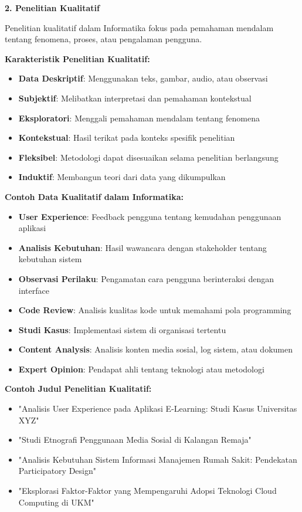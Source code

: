 \textbf{2. Penelitian Kualitatif}

Penelitian kualitatif dalam Informatika fokus pada pemahaman mendalam tentang fenomena, proses, atau pengalaman pengguna.

\textbf{Karakteristik Penelitian Kualitatif:}
\begin{itemize}
    \item \textbf{Data Deskriptif}: Menggunakan teks, gambar, audio, atau observasi
    \item \textbf{Subjektif}: Melibatkan interpretasi dan pemahaman kontekstual
    \item \textbf{Eksploratori}: Menggali pemahaman mendalam tentang fenomena
    \item \textbf{Kontekstual}: Hasil terikat pada konteks spesifik penelitian
    \item \textbf{Fleksibel}: Metodologi dapat disesuaikan selama penelitian berlangsung
    \item \textbf{Induktif}: Membangun teori dari data yang dikumpulkan
\end{itemize}

\textbf{Contoh Data Kualitatif dalam Informatika:}
\begin{itemize}
    \item \textbf{User Experience}: Feedback pengguna tentang kemudahan penggunaan aplikasi
    \item \textbf{Analisis Kebutuhan}: Hasil wawancara dengan stakeholder tentang kebutuhan sistem
    \item \textbf{Observasi Perilaku}: Pengamatan cara pengguna berinteraksi dengan interface
    \item \textbf{Code Review}: Analisis kualitas kode untuk memahami pola programming
    \item \textbf{Studi Kasus}: Implementasi sistem di organisasi tertentu
    \item \textbf{Content Analysis}: Analisis konten media sosial, log sistem, atau dokumen
    \item \textbf{Expert Opinion}: Pendapat ahli tentang teknologi atau metodologi
\end{itemize}

\textbf{Contoh Judul Penelitian Kualitatif:}
\begin{itemize}
    \item "Analisis User Experience pada Aplikasi E-Learning: Studi Kasus Universitas XYZ"
    \item "Studi Etnografi Penggunaan Media Sosial di Kalangan Remaja"
    \item "Analisis Kebutuhan Sistem Informasi Manajemen Rumah Sakit: Pendekatan Participatory Design"
    \item "Eksplorasi Faktor-Faktor yang Mempengaruhi Adopsi Teknologi Cloud Computing di UKM"
\end{itemize}

